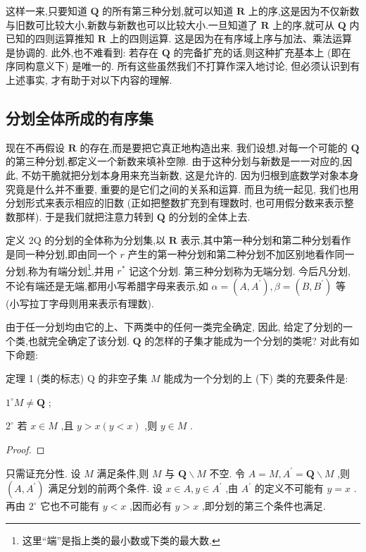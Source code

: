 这样一来,只要知道 \(\mathbf{Q}\) 的所有第三种分划,就可以知道 \(\mathbf{R}\) 上的序,这是因为不仅新数与旧数可比较大小,新数与新数也可以比较大小.一旦知道了 \(\mathbf{R}\) 上的序,就可从 \(\mathbf{Q}\) 内已知的四则运算推知 \(\mathbf{R}\) 上的四则运算. 这是因为在有序域上序与加法、乘法运算是协调的. 此外,也不难看到: 若存在 \(\mathbf{Q}\) 的完备扩充的话,则这种扩充基本上 (即在序同构意义下) 是唯一的. 所有这些虽然我们不打算作深入地讨论, 但必须认识到有上述事实, 才有助于对以下内容的理解.

\subsection{分划全体所成的有序集}

现在不再假设 \(\mathbf{R}\) 的存在,而是要把它真正地构造出来. 我们设想,对每一个可能的 \(\mathbf{Q}\) 的第三种分划,都定义一个新数来填补空隙. 由于这种分划与新数是一一对应的,因此, 不妨干脆就把分划本身用来充当新数, 这是允许的. 因为归根到底数学对象本身究竟是什么并不重要, 重要的是它们之间的关系和运算. 而且为统一起见, 我们也用分划形式来表示相应的旧数 (正如把整数扩充到有理数时, 也可用假分数来表示整数那样). 于是我们就把注意力转到 \(\mathbf{Q}\) 的分划的全体上去.

定义 \(2\mathrm{Q}\) 的分划的全体称为分划集,以 \(\mathbf{R}\) 表示,其中第一种分划和第二种分划看作是同一种分划,即由同一个 \(r\) 产生的第一种分划和第二种分划不加区别地看作同一分划,称为有端分划\footnote{这里“端”是指上类的最小数或下类的最大数.},并用 \({r}^{ * }\) 记这个分划. 第三种分划称为无端分划. 今后凡分划, 不论有端还是无端,都用小写希腊字母来表示,如 \(\alpha  = \left( {A,{A}^{\prime }}\right) ,\beta  = \left( {B,{B}^{\prime }}\right)\) 等 (小写拉丁字母则用来表示有理数).

由于任一分划均由它的上、下两类中的任何一类完全确定, 因此, 给定了分划的一个类,也就完全确定了该分划. \(\mathbf{Q}\) 的怎样的子集才能成为一个分划的类呢? 对此有如下命题:

定理 1 (类的标志) Q 的非空子集 \(M\) 能成为一个分划的上 (下) 类的充要条件是:

\({1}^{ \circ  }M \neq  \mathbf{Q}\) ;

\({2}^{ \circ  }\) 若 \(x \in  M\) ,且 \(y > x\left( {y < x}\right)\) ,则 \(y \in  M\) .

\begin{proof}

\end{proof}
只需证充分性. 设 \(M\) 满足条件,则 \(M\) 与 \(\mathbf{Q} \smallsetminus  M\) 不空. 令 \(A = M,{A}^{\prime } = \mathbf{Q} \smallsetminus  M\) ,则 \(\left( {A,{A}^{\prime }}\right)\) 满足分划的前两个条件. 设 \(x \in  A,y \in  {A}^{\prime }\) ,由 \({A}^{\prime }\) 的定义不可能有 \(y = x\) . 再由 \({2}^{ \circ  }\) 它也不可能有 \(y < x\) ,因而必有 \(y > x\) ,即分划的第三个条件也满足.

